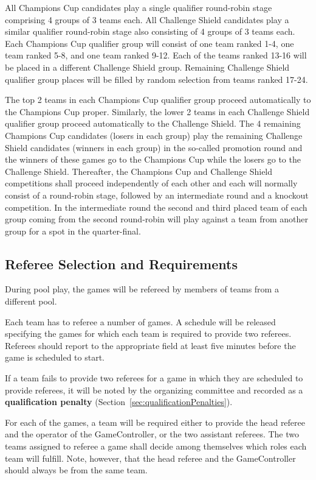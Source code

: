 All Champions Cup candidates play a single qualifier round-robin stage comprising 4 groups of 3 teams each. All Challenge Shield candidates play a similar qualifier round-robin stage also consisting of 4 groups of 3 teams each. Each Champions Cup qualifier group will consist of one team ranked 1-4, one team ranked 5-8, and one team ranked 9-12. Each of the teams ranked 13-16 will be placed in a different Challenge Shield group. Remaining Challenge Shield qualifier group places will be filled by random selection from teams ranked 17-24.

The top 2 teams in each Champions Cup qualifier group proceed automatically to the Champions Cup proper. Similarly, the lower 2 teams in each Challenge Shield qualifier group proceed automatically to the Challenge Shield. The 4 remaining Champions Cup candidates (losers in each group) play the remaining Challenge Shield candidates (winners in each group) in the so-called promotion round and the winners of these games go to the Champions Cup while the losers go to the Challenge Shield. Thereafter, the Champions Cup and Challenge Shield competitions shall proceed independently of each other and each will normally consist of a round-robin stage, followed by an intermediate round and a knockout competition. In the intermediate round the second and third placed team of each group coming from the second round-robin will play against a team from another group for a spot in the quarter-final.

\subsection{Referee Selection and Requirements}
\label{sec:refSelection}
During pool play, the games will be refereed by members of teams from a different pool.

Each team has to referee a number of games. A schedule will be released specifying the games for which each team is required to provide two referees. Referees should report to the appropriate field at least five minutes before the game is scheduled to start.

If a team fails to provide two referees for a game in which they are scheduled to provide referees, it will be noted by the organizing committee and recorded as a \textbf{qualification penalty} (Section~\ref{sec:qualificationPenalties}).

For each of the games, a team will be required either to provide the head referee and the operator of the GameController, or the two assistant referees.  The two teams assigned to referee a game shall decide among themselves which roles each team will fulfill. Note, however, that the head referee and the GameController should always be from the same team.

